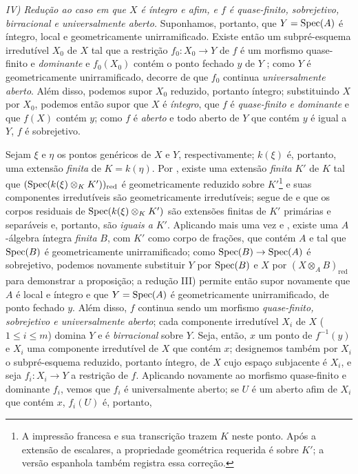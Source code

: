 \emph{IV) Redução ao caso em que $X$ é íntegro e afim, e $f$ é quase-finito, sobrejetivo, birracional e universalmente aberto.}
Suponhamos, portanto, que $Y=\operatorname{Spec}(A)$ é íntegro, local e geometricamente unirramificado.
Existe então um subpré-esquema irredutível $X_0$ de $X$ tal que a restrição $f_0:X_0\to Y$ de $f$ é um morfismo quase-finito e \emph{dominante} e $f_0(X_0)$ contém o ponto fechado $y$ de $Y$ ; como $Y$ é geometricamente unirramificado, decorre de  que $f_0$ continua \emph{universalmente aberto}.
Além disso, podemos supor $X_0$ reduzido, portanto íntegro; substituindo $X$ por $X_0$, podemos então supor que $X$ é \emph{íntegro}, que $f$ é \emph{quase-finito e dominante} e que $f(X)$ contém $y$; como $f$ é \emph{aberto} e todo aberto de $Y$ que contém $y$ é igual a $Y$, $f$ é sobrejetivo.

Sejam $\xi$ e $\eta$ os pontos genéricos de $X$ e $Y$, respectivamente; $k(\xi)$ é, portanto, uma extensão \emph{finita} de $K=k(\eta)$.
Por , existe uma extensão \emph{finita} $K'$ de $K$ tal que $(\operatorname{Spec}(k(\xi)\otimes_K K'))_{\mathrm{red}}$ é geometricamente reduzido sobre $K'$\footnote{A impressão francesa e sua transcrição trazem $K$ neste ponto. Após a extensão de escalares, a propriedade geométrica requerida é sobre $K'$; a versão espanhola também registra essa correção.} e suas componentes irredutíveis são geometricamente irredutíveis; segue de  e  que os corpos residuais de $\operatorname{Spec}(k(\xi)\otimes_K K')$ são extensões finitas de $K'$ primárias e separáveis e, portanto, são \emph{iguais a} $K'$.
Aplicando mais uma vez  e , existe uma $A$-álgebra íntegra \emph{finita} $B$, com $K'$ como corpo de frações, que contém $A$ e tal que $\operatorname{Spec}(B)$ é geometricamente unirramificado; como $\Spec(B)\to\Spec(A)$ é sobrejetivo, podemos novamente substituir $Y$ por $\operatorname{Spec}(B)$ e $X$ por $(X\otimes_A B)_{\mathrm{red}}$ para demonstrar a proposição; a redução III) permite então supor novamente que $A$ é local e íntegro e que $Y=\operatorname{Spec}(A)$ é geometricamente unirramificado, de ponto fechado $y$.
Além disso, $f$ continua sendo um morfismo \emph{quase-finito, sobrejetivo e universalmente aberto}; cada componente irredutível $X_i$ de $X$ ($1\leq i\leq m$) domina $Y$  e é \emph{birracional} sobre $Y$.
Seja, então, $x$ um ponto de $f^{-1}(y)$ e $X_i$ uma componente irredutível de $X$ que contém $x$; designemos também por $X_i$ o subpré-esquema reduzido, portanto íntegro, de $X$ cujo espaço subjacente é $X_i$, e seja $f_i:X_i\to Y$ a restrição de $f$.
Aplicando novamente  ao morfismo quase-finito e dominante $f_i$, vemos que $f_i$ é universalmente aberto; se $U$ é um aberto afim de $X_i$ que contém $x$, $f_i(U)$ é, portanto,

